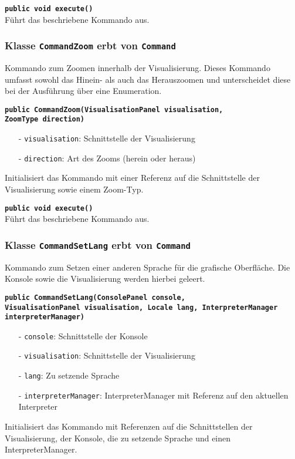 \documentclass[parskip=full,11pt,twoside]{scrartcl}
\begin{document}
\textbf{\texttt{public void execute()}}\\
Führt das beschriebene Kommando aus.

\subsubsection{Klasse \texttt{CommandZoom} erbt von \texttt{Command}}

Kommando zum Zoomen innerhalb der Visualisierung. Dieses Kommando umfasst sowohl das Hinein- als auch das Herauszoomen und unterscheidet diese bei der Ausführung über eine Enumeration.

\textbf{\texttt{public CommandZoom(VisualisationPanel visualisation,\\ZoomType direction)}}
\begin{itemize}[noitemsep]
	\item[-] \texttt{visualisation}: Schnittstelle der Visualisierung
	\item[-] \texttt{direction}: Art des Zooms (herein oder heraus)
\end{itemize}
Initialisiert das Kommando mit einer Referenz auf die Schnittstelle der Visualisierung sowie einem Zoom-Typ.

\textbf{\texttt{public void execute()}}\\
Führt das beschriebene Kommando aus.

\subsubsection{Klasse \texttt{CommandSetLang} erbt von \texttt{Command}}

Kommando zum Setzen einer anderen Sprache für die grafische Oberfläche. Die Konsole sowie die Visualisierung werden hierbei geleert.

\textbf{\texttt{public CommandSetLang(ConsolePanel console,\\VisualisationPanel visualisation, Locale lang, InterpreterManager interpreterManager)}}
\begin{itemize}[noitemsep]
	\item[-] \texttt{console}: Schnittstelle der Konsole
	\item[-] \texttt{visualisation}: Schnittstelle der Visualisierung
        \item[-] \texttt{lang}: Zu setzende Sprache
	\item[-] \texttt{interpreterManager}: InterpreterManager mit Referenz auf den aktuellen Interpreter
\end{itemize}
Initialisiert das Kommando mit Referenzen auf die Schnittstellen der Visualisierung, der Konsole, die zu setzende Sprache und einen InterpreterManager.
\end{document}
